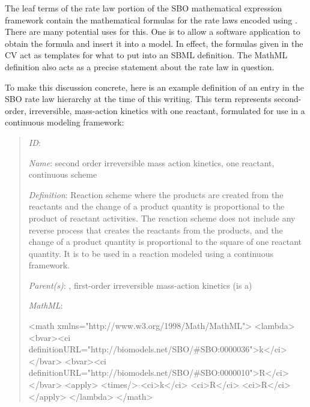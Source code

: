 The leaf terms of the rate law portion of the SBO mathematical
expression framework contain the mathematical formulas for the
rate laws encoded using \mathmltwo.  There are many potential uses
for this.  One is to allow a software application to obtain the
formula and insert it into a model.  In effect, the formulas given
in the CV act as templates for what to put into an SBML
\KineticLaw definition.  The MathML definition also acts as a
precise statement about the rate law in question.

To make this discussion concrete, here is an example definition of
an entry in the SBO rate law hierarchy at the time of this
writing.  This term represents second-order, irreversible,
mass-action kinetics with one reactant, formulated for use in a
continuous modeling framework:
\begin{quote}
\begin{description}

\item \emph{ID}: 

\item \emph{Name}: second order irreversible mass action kinetics,
  one reactant, continuous scheme

\item \emph{Definition}: Reaction scheme where the products are
  created from the reactants and the change of a product quantity
  is proportional to the product of reactant activities. The
  reaction scheme does not include any reverse process that
  creates the reactants from the products, and the change of a
  product quantity is proportional to the square of one reactant
  quantity. It is to be used in a reaction modeled using a
  continuous framework.

\item \emph{Parent(s)}: , first-order
  irreversible mass-action kinetics (is a)

\item \emph{MathML}:
\begin{example}
<math xmlns="http://www.w3.org/1998/Math/MathML">
   <lambda>
     <bvar><ci definitionURL="http://biomodels.net/SBO/#SBO:0000036">k</ci></bvar>
     <bvar><ci definitionURL="http://biomodels.net/SBO/#SBO:0000010">R</ci></bvar>
     <apply>
         <times/>
         <ci>k</ci>
         <ci>R</ci>
         <ci>R</ci>
     </apply>
   </lambda>
</math>
\end{example}

\end{description}
\end{quote}

